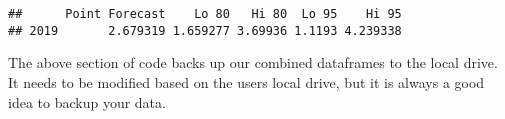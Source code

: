 \documentclass[
]{article}
\begin{document}
\begin{verbatim}
##      Point Forecast    Lo 80   Hi 80  Lo 95    Hi 95
## 2019       2.679319 1.659277 3.69936 1.1193 4.239338
\end{verbatim}

The above section of code backs up our combined dataframes to the local
drive. It needs to be modified based on the users local drive, but it is
always a good idea to backup your data.
\end{document}
